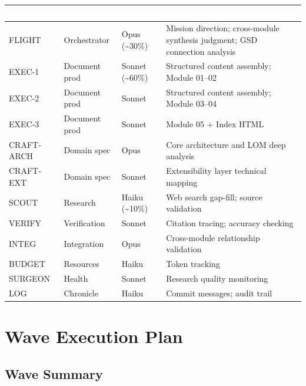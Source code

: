\documentclass[11pt,letterpaper]{article}
\newcommand{\tableheader}[1]{\textbf{\sffamily\textcolor{white}{#1}}}
\begin{document}
\begin{center}
\begin{tabularx}{\textwidth}{L{2cm}L{2cm}C{2.5cm}X}
\toprule
{}
\tableheader{Role} & \tableheader{Agent} & \tableheader{Model} & \tableheader{Rationale} \\
\midrule
FLIGHT & Orchestrator & Opus (\textasciitilde 30\%) & Mission direction; cross-module synthesis judgment; GSD connection analysis \\
EXEC-1 & Document prod & Sonnet (\textasciitilde 60\%) & Structured content assembly; Module 01--02 \\
EXEC-2 & Document prod & Sonnet & Structured content assembly; Module 03--04 \\
EXEC-3 & Document prod & Sonnet & Module 05 + Index HTML \\
CRAFT-ARCH & Domain spec & Opus & Core architecture and LOM deep analysis \\
CRAFT-EXT & Domain spec & Sonnet & Extensibility layer technical mapping \\
SCOUT & Research & Haiku (\textasciitilde 10\%) & Web search gap-fill; source validation \\
VERIFY & Verification & Sonnet & Citation tracing; accuracy checking \\
INTEG & Integration & Opus & Cross-module relationship validation \\
BUDGET & Resources & Haiku & Token tracking \\
SURGEON & Health & Sonnet & Research quality monitoring \\
LOG & Chronicle & Haiku & Commit messages; audit trail \\
\bottomrule
\end{tabularx}
\end{center}

\section{Wave Execution Plan}

\subsection{Wave Summary}
\end{document}
